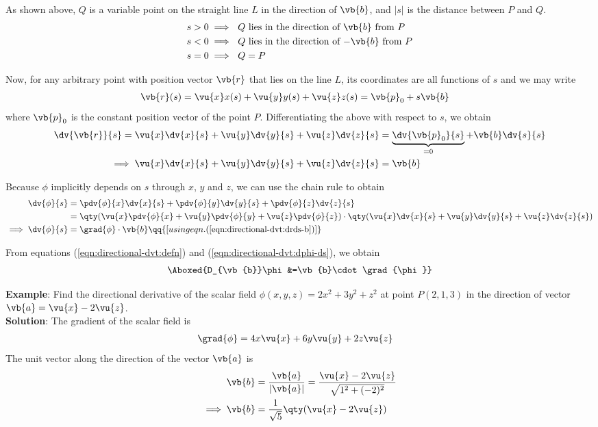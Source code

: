 			As shown above, $Q$ is a variable point on the straight line $L$ in the direction of $\vb{b}$, and $|s|$ is the distance between $P$ and $Q$.
			\begin{align*}
				{s>0}&\implies\text{ $Q$ lies in the direction of $\vb{b}$ from $P$} \\
				{s<0}&\implies\text{ $Q$ lies in the direction of $-\vb{b}$ from $P$} \\
				{s=0}&\implies\text{ $Q=P$}
			\end{align*}
			
			Now, for any arbitrary point with position vector $\vb{r}$ that lies on the line $L$, its coordinates are all functions of $s$ and we may write
			\begin{align*}
				\vb{r}(s)&=\vu{x}x(s)+\vu{y}y(s)+\vu{z}z(s)=\vb{p}_0+s\vb{b}
			\end{align*}
			where $\vb{p}_0$ is the constant position vector of the point $P$. Differentiating the above with respect to $s$, we obtain
			\begin{align}
				\dv{\vb{r}}{s}=\vu{x}\dv{x}{s}+\vu{y}\dv{y}{s}+\vu{z}\dv{z}{s}&=\underbrace{\dv{\vb{p}_0}{s}}_{=0}+\vb{b}\dv{s}{s} \nonumber\\
				\implies\vu{x}\dv{x}{s}+\vu{y}\dv{y}{s}+\vu{z}\dv{z}{s}&=\vb{b} \label{eqn:directional-dvt:drds-b}
			\end{align}
			
			Because $\phi$ implicitly depends on $s$ through $x$, $y$ and $z$, we can use the chain rule to obtain
			\begin{align}
				\dv{\phi}{s}&=\pdv{\phi}{x}\dv{x}{s}+\pdv{\phi}{y}\dv{y}{s}+\pdv{\phi}{z}\dv{z}{s} \nonumber\\
				&=\qty(\vu{x}\pdv{\phi}{x}+\vu{y}\pdv{\phi}{y}+\vu{z}\pdv{\phi}{z})\cdot\qty(\vu{x}\dv{x}{s}+\vu{y}\dv{y}{s}+\vu{z}\dv{z}{s}) \nonumber\\
				\implies\dv{\phi}{s}&=\grad{\phi}\cdot\vb{b}\qq{[using eqn. (\ref{eqn:directional-dvt:drds-b})]} \label{eqn:directional-dvt:dphi-ds}
			\end{align}
			
			From equations (\ref{eqn:directional-dvt:defn}) and (\ref{eqn:directional-dvt:dphi-ds}), we obtain
			\begin{align*}
				\Aboxed{D_{\vb{b}}\phi&=\vb{b}\cdot\grad{\phi}}
			\end{align*}
			
			\textbf{Example}: Find the directional derivative of the scalar field $\phi(x,y,z)=2x^2+3y^2+z^2$ at point $P(2,1,3)$ in the direction of vector $\vb{a}=\vu{x}-2\vu{z}$.\\
			\textbf{Solution}: The gradient of the scalar field is
			\begin{align*}
				\grad{\phi}&=4x\vu{x}+6y\vu{y}+2z\vu{z}
			\end{align*}
			The unit vector along the direction of the vector $\vb{a}$ is
			\begin{align*}
				\vb{b}&=\dfrac{\vb{a}}{|\vb{a}|}=\dfrac{\vu{x}-2\vu{z}}{\sqrt{1^2+(-2)^2}} \\
				\implies\vb{b}&=\dfrac{1}{\sqrt{5}}\qty(\vu{x}-2\vu{z})
			\end{align*}
			
